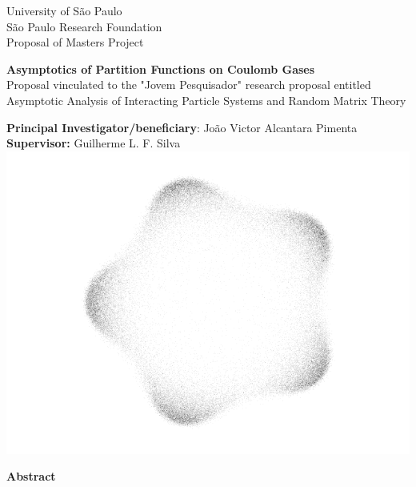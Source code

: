 \documentclass[12pt,a4paper]{article}
\numberwithin{equation}{section} %
\begin{document}
\begin{titlepage}
    \begin{center}
        {\large \sc University of São Paulo} \\
		{\large \sc São Paulo Research Foundation}\\
    	{\large \sc Proposal of Masters Project}
    	
    	\vspace{1cm}
    	
    	{\Large \bfseries Asymptotics of Partition Functions on Coulomb Gases} \\
    	\vspace{1cm}
    	{\small \sc Proposal vinculated to the "Jovem Pesquisador" research proposal entitled} \\
    	{\small \sc Asymptotic Analysis of Interacting Particle Systems and Random Matrix Theory} \\
    	\vspace{1cm}
    	
    	{\small \sc \textbf{Principal Investigator/beneficiary}: João Victor Alcantara Pimenta}\\
    	{\small \sc \textbf{Supervisor:} Guilherme L. F. Silva}\\[0.5cm]
    	
    	\includegraphics[scale=0.35]{Assets/CuteCircleWhite}
    	
    \end{center}

    \vfill

    \begin{center}
        {\bf \large Abstract} \\[1em]
    \end{center}
    
    
\end{titlepage}
\end{document}

